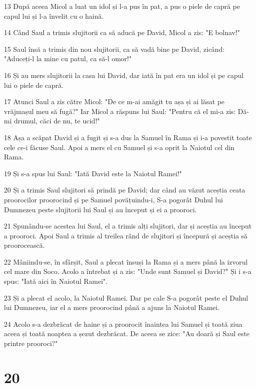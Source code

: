 \par 13 După aceea Micol a luat un idol și l-a pus în pat, a pus o piele de capră pe capul lui și l-a învelit cu o haină.
\par 14 Când Saul a trimis slujitorii ca să aducă pe David, Micol a zis: "E bolnav!"
\par 15 Saul însă a trimis din nou slujitorii, ca să vadă bine pe David, zicând: "Aduceți-l la mine cu patul, ca să-l omor!"
\par 16 Și au mers slujitorii la casa lui David, dar iată în pat era un idol și pe capul lui o piele de capră.
\par 17 Atunci Saul a zis către Micol: "De ce m-ai amăgit tu așa și ai lăsat pe vrăjmașul meu să fugă?" Iar Micol a răspuns lui Saul: "Pentru că el mi-a zis: Dă-mi drumul, căci de nu, te ucid!"
\par 18 Așa a scăpat David și a fugit și s-a dus la Samuel în Rama și i-a povestit toate cele ce-i făcuse Saul. Apoi a mers el cu Samuel și s-a oprit la Naiotul cel din Rama.
\par 19 Și s-a spus lui Saul: "Iată David este la Naiotul Ramei!"
\par 20 Și a trimis Saul slujitori să prindă pe David; dar când au văzut aceștia ceata proorocilor proorocind și pe Samuel povățuindu-i, S-a pogorât Duhul lui Dumnezeu peste slujitorii lui Saul și au început și ei a prooroci.
\par 21 Spunându-se acestea lui Saul, el a trimis alți slujitori, dar și aceștia au început a prooroci. Apoi Saul a trimis al treilea rând de slujitori și începură și aceștia să proorocească.
\par 22 Mâniindu-se, în sfârșit, Saul a plecat însuși la Rama și a mers până la izvorul cel mare din Soco. Acolo a întrebat și a zis: "Unde sunt Samuel și David?" Și i s-a spus: "Iată aici în Naiotul Ramei".
\par 23 Și a plecat el acolo, la Naiotul Ramei. Dar pe cale S-a pogorât peste el Duhul lui Dumnezeu, iar el a mers proorocind până a ajuns la Naiotul Ramei.
\par 24 Acolo s-a dezbrăcat de haine și a proorocit înaintea lui Samuel și toată ziua aceea și toată noaptea a șezut dezbrăcat. De aceea se zice: "Au doară și Saul este printre prooroci?"

\chapter{20}

